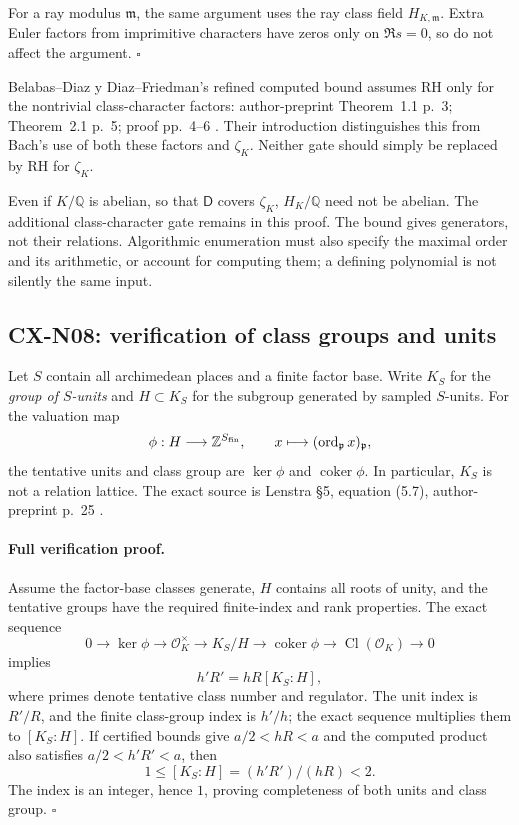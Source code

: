 \documentclass[11pt,a4paper]{article}
\begin{document}
For a ray modulus \(\mathfrak m\), the same argument uses the ray
class field \(H_{K,\mathfrak m}\). Extra Euler factors from imprimitive
characters have zeros only on \(\Re s=0\), so do not affect the argument.
\(\square\)

Belabas--Diaz y Diaz--Friedman's refined computed bound assumes RH
only for the nontrivial class-character factors: author-preprint
Theorem~1.1 p.~3; Theorem~2.1 p.~5; proof pp.~4--6
\cite{CXNBDF08}. Their introduction distinguishes this from Bach's use
of both these factors and \(\zeta_K\). Neither gate should simply be
replaced by RH for \(\zeta_K\).

Even if \(K/\mathbb Q\) is abelian, so that \(\mathsf D\) covers
\(\zeta_K\), \(H_K/\mathbb Q\) need not be abelian. The additional
class-character gate remains in this proof. The bound gives generators,
not their relations. Algorithmic enumeration must also specify the
maximal order and its arithmetic, or account for computing them;
a defining polynomial is not silently the same input.

\subsection{CX-N08: verification of class groups and units}
\label{cx-n08}

Let \(S\) contain all archimedean places and a finite factor base.
Write \(K_S\) for the \emph{group of \(S\)-units} and \(H\subset K_S\)
for the subgroup generated by sampled \(S\)-units. For the valuation map
\[
 \phi:H\longrightarrow\mathbb Z^{S_{\rm fin}},\qquad
 x\longmapsto(\operatorname{ord}_{\mathfrak p}x)_{\mathfrak p},
\]
the tentative units and class group are \(\ker\phi\) and
\(\operatorname{coker}\phi\). In particular, \(K_S\) is not a relation
lattice. The exact source is Lenstra \S5, equation (5.7), author-preprint
p.~25 \cite{CXNLenstra92}.

\paragraph{Full verification proof.}
Assume the factor-base classes generate, \(H\) contains all roots of
unity, and the tentative groups have the required finite-index and rank
properties. The exact sequence
\[
 0\longrightarrow\ker\phi\longrightarrow\mathcal O_K^\times
 \longrightarrow K_S/H\longrightarrow\operatorname{coker}\phi
 \longrightarrow\operatorname{Cl}(\mathcal O_K)\longrightarrow0
\]
implies
\[
                              h'R'=hR[K_S:H],                 \tag{N08.1}
\]
where primes denote tentative class number and regulator.
The unit index is \(R'/R\), and the finite class-group index is
\(h'/h\); the exact sequence multiplies them to \([K_S:H]\).
If certified bounds give \(a/2<hR<a\) and the computed product also
satisfies \(a/2<h'R'<a\), then
\[
                         1\leq[K_S:H]=(h'R')/(hR)<2.
\]
The index is an integer, hence \(1\), proving completeness of both
units and class group. \(\square\)
\end{document}
